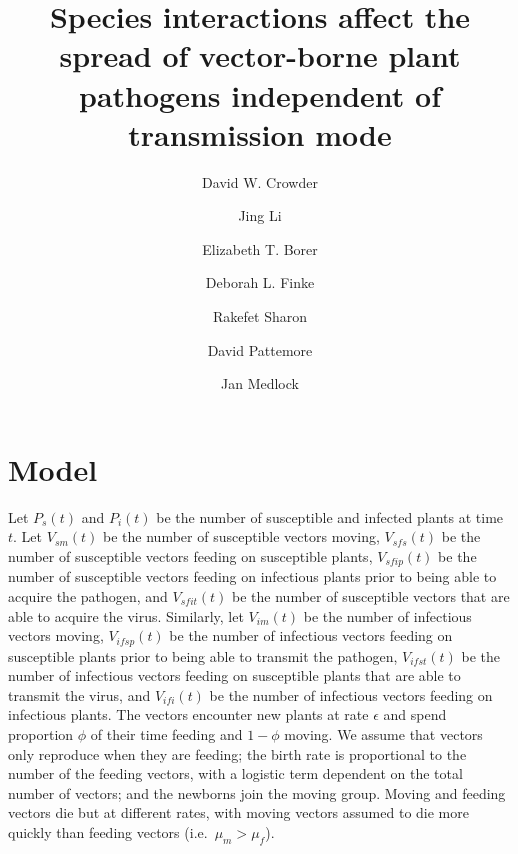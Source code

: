 \documentclass{article}
\title{Species interactions affect the spread of vector-borne plant
  pathogens independent of transmission mode}
\author{
  David W. Crowder
  \and
  Jing Li
  \and
  Elizabeth T. Borer
  \and
  Deborah L. Finke
  \and
  Rakefet Sharon
  \and
  David Pattemore
  \and
  Jan Medlock
}
\begin{document}
\maketitle

\section{Model}

Let $P_s(t)$ and $P_i(t)$ be the number of susceptible and infected
plants at time $t$.  Let $V_{sm}(t)$ be the number of susceptible
vectors moving, $V_{sfs}(t)$ be the number of susceptible vectors
feeding on susceptible plants, $V_{sfip}(t)$ be the number of
susceptible vectors feeding on infectious plants prior to being able
to acquire the pathogen, and $V_{sfit}(t)$ be the number of
susceptible vectors that are able to acquire the virus.  Similarly,
let $V_{im}(t)$ be the number of infectious vectors moving,
$V_{ifsp}(t)$ be the number of infectious vectors feeding on
susceptible plants prior to being able to transmit the pathogen,
$V_{ifst}(t)$ be the number of infectious vectors feeding on
susceptible plants that are able to transmit the virus, and
$V_{ifi}(t)$ be the number of infectious vectors feeding on infectious
plants.  The vectors encounter new plants at rate $\epsilon$ and spend
proportion $\phi$ of their time feeding and $1 - \phi$ moving.  We
assume that vectors only reproduce when they are feeding; the birth
rate is proportional to the number of the feeding vectors, with a
logistic term dependent on the total number of vectors; and the
newborns join the moving group.  Moving and feeding vectors die but at
different rates, with moving vectors assumed to die more quickly than
feeding vectors (i.e.~$\mu_m > \mu_f$).
\end{document}
